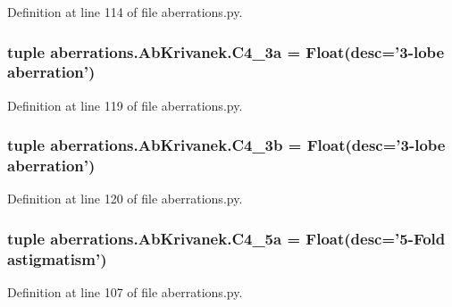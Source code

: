 Definition at line 114 of file aberrations.\-py.

\hypertarget{classaberrations_1_1_ab_krivanek_ae316c7dc0ea6f28b04bfd2100764099e}{
\subsubsection[{C4\-\_\-3a}]{\setlength{\rightskip}{0pt plus 5cm}tuple aberrations.\-Ab\-Krivanek.\-C4\-\_\-3a = Float(desc='3-\/lobe {\bf aberration}')\hspace{0.3cm}{\ttfamily [static]}}}\label{classaberrations_1_1_ab_krivanek_ae316c7dc0ea6f28b04bfd2100764099e}


Definition at line 119 of file aberrations.\-py.

\hypertarget{classaberrations_1_1_ab_krivanek_a8cf52df7725ea8a872e55e64d8723066}{
\subsubsection[{C4\-\_\-3b}]{\setlength{\rightskip}{0pt plus 5cm}tuple aberrations.\-Ab\-Krivanek.\-C4\-\_\-3b = Float(desc='3-\/lobe {\bf aberration}')\hspace{0.3cm}{\ttfamily [static]}}}\label{classaberrations_1_1_ab_krivanek_a8cf52df7725ea8a872e55e64d8723066}


Definition at line 120 of file aberrations.\-py.

\hypertarget{classaberrations_1_1_ab_krivanek_a7c6b7ffa2a750e4886d48acc0043e543}{
\subsubsection[{C4\-\_\-5a}]{\setlength{\rightskip}{0pt plus 5cm}tuple aberrations.\-Ab\-Krivanek.\-C4\-\_\-5a = Float(desc='5-\/Fold astigmatism')\hspace{0.3cm}{\ttfamily [static]}}}\label{classaberrations_1_1_ab_krivanek_a7c6b7ffa2a750e4886d48acc0043e543}


Definition at line 107 of file aberrations.\-py.

